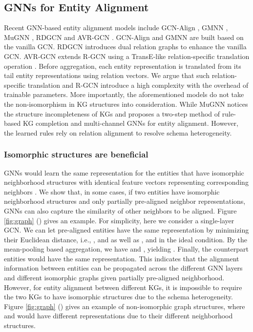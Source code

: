 \documentclass[letterpaper]{article} \usepackage{aaai20}  \usepackage{times}  \usepackage{helvet} \usepackage{courier}  \usepackage[hyphens]{url}  \usepackage{graphicx} \urlstyle{rm} \def\UrlFont{\rm}  \frenchspacing  \setlength{\pdfpagewidth}{8.5in}  \setlength{\pdfpageheight}{11in}  \usepackage{amsmath}
\begin{document}
\subsection{GNNs for Entity Alignment}
Recent GNN-based entity alignment models include GCN-Align \cite{GCN_Align}, GMNN \cite{KGMatching}, MuGNN \cite{MuGNN}, RDGCN \cite{RDGCN} and AVR-GCN \cite{AVR-GCN}. GCN-Align and GMNN are built based on the vanilla GCN. RDGCN introduces dual relation graphs to enhance the vanilla GCN. AVR-GCN extends R-GCN using a TransE-like relation-specific translation operation \cite{TransE}. Before aggregation, each entity representation is translated from its tail entity representations using relation vectors. We argue that such relation-specific translation and R-GCN introduce a high complexity with the overhead of trainable parameters. More importantly, the aforementioned models do not take the non-isomorphism in KG structures into consideration. While MuGNN \cite{MuGNN} notices the structure incompleteness of KGs and proposes a two-step method of rule-based KG completion and multi-channel GNNs for entity alignment. However, the learned rules rely on relation alignment to resolve schema heterogeneity.

\subsubsection{Isomorphic structures are beneficial}
GNNs would learn the same representation for the entities that have isomorphic neighborhood structures with identical feature vectors representing corresponding neighbors \cite{PowerGCN}. We show that, in some cases, if two entities have isomorphic neighborhood structures and only partially pre-aligned neighbor representations, GNNs can also capture the similarity of other neighbors to be aligned. Figure \ref{fig:graph} () gives an example. For simplicity, here we consider a single-layer GCN. We can let pre-aligned entities have the same representation by minimizing their Euclidean distance, i.e., ,  and  as well as ,  and  in the ideal condition. By the mean-pooling based aggregation, we have  and , yielding . Finally, the counterpart entities would have the same representation. This indicates that the alignment information between entities can be propagated across the different GNN layers and different isomorphic graphs given partially pre-aligned neighborhood. However, for entity alignment between different KGs, it is impossible to require the two KGs to have isomorphic structures due to the schema heterogeneity. Figure \ref{fig:graph} () gives an example of non-isomorphic graph structures, where  and  would have different representations due to their different neighborhood structures. 
\end{document}
